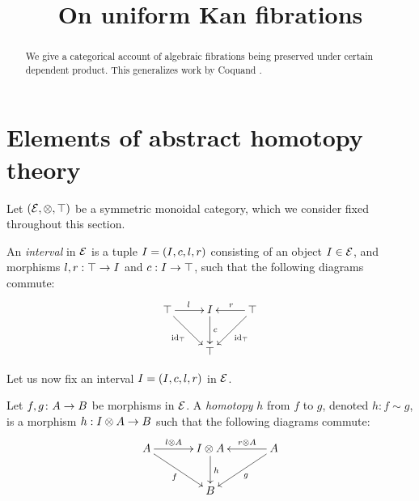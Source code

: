 \documentclass[reqno,10pt,a4paper,oneside]{amsart}
\title{On uniform Kan fibrations}
\begin{document}
\begin{abstract}
We give a categorical account of algebraic fibrations being preserved under certain dependent product.
This generalizes work by Coquand \etal.
\end{abstract}

\maketitle

\tableofcontents


\section{Elements of abstract homotopy theory} 

Let $(\mathcal{E}, \otimes, \top)$ be a symmetric monoidal category, which we consider fixed throughout this section. 

\begin{definition} An \emph{interval} in $\mathcal{E}$ is a tuple $I = (I, c, l, r)$ consisting of  an object $I \in \mathcal{E}$, 
and morphisms $l, r : \top \to I$ and $c : I \to \top$,   such that the following diagrams commute:
\[
\xymatrix{
\unit \ar[r]^\intervall \ar[dr]_{\id_\unit} & \interval \ar[d]^-{c} & \unit \ar[dl]^{\id_\unit} \ar[l]_{\intervalr}  \\
 & \unit & }
 \]
\end{definition}

Let us now fix an interval $I = (I, c, l, r)$ in $\mathcal{E}$. 



\begin{definition}
\label{def:homotopy}
Let $f, g \colon A \to B$ be morphisms in $\mathcal{E}$. A \emph{homotopy} $h$ from $f$ to $g$, denoted $h : f \sim g$, is a morphism $h : I \otimes A \to B$ such that the following diagrams commute:
\[
\xymatrix@C=1.2cm{
A \ar[r]^-{\intervall \otimes A} \ar[dr]_{f} & \interval \otimes A \ar[d]^{h} & A \ar[dl]^{g} \ar[l]_-{r \otimes A}  \\
 & B & }
 \]
\end{definition}
\end{document}
